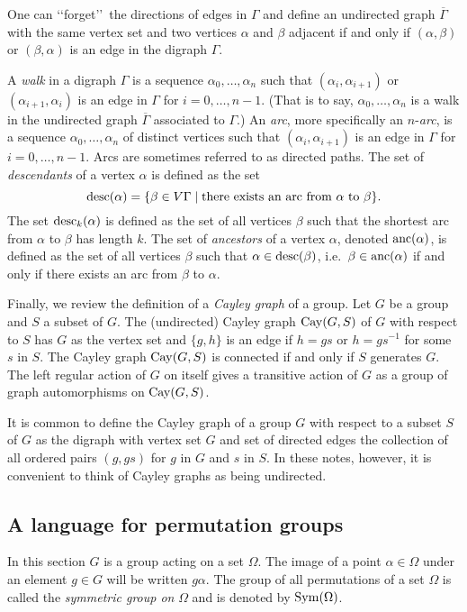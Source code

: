 \documentclass{emsprocart}
\theoremstyle{definition}
\begin{document}
One can \lq\lq forget\rq\rq\ the directions of edges in $\Gamma$ and define an undirected graph
$\overline{\Gamma}$ with the same vertex set and two vertices $\alpha$
and $\beta$ adjacent if and only if $(\alpha, \beta)$ or $(\beta,
\alpha)$ is an edge in the digraph $\Gamma$.

A {\em walk} in a digraph $\Gamma$ is a sequence $\alpha_0,
\ldots, \alpha_n$ such that $(\alpha_i, \alpha_{i+1})$ or
$(\alpha_{i+1}, \alpha_i)$ is an edge in $\Gamma$ for $i=0, \ldots,
n-1$.  (That is to say, $\alpha_0,
\ldots, \alpha_n$ is a walk in the undirected graph
$\overline{\Gamma}$ associated to $\Gamma$.)   An {\em arc}, more specifically an $n$-{\em arc},
is a sequence $\alpha_0,\ldots, \alpha_n$ of distinct vertices  such that
$(\alpha_i, \alpha_{i+1})$ is an edge in $\Gamma$ for $i=0, \ldots,
n-1$.  Arcs are sometimes referred to as directed paths.  The set of {\em descendants} of a vertex $\alpha$ is defined as
the set
$${\mbox{${\rm desc}$}}(\alpha)=\{\beta\in V\Gamma\mid \mbox{there exists an arc
   from }\alpha\mbox{ to }\beta\}.$$
The set ${\mbox{${\rm desc}$}}_k(\alpha)$ is defined as the set of all vertices $\beta$
  such that the shortest arc from $\alpha$ to $\beta$ has
  length $k$.
The set of {\em ancestors} of a vertex $\alpha$, denoted
  ${\mbox{${\rm anc}$}}(\alpha)$,  is defined as the set
  of all vertices $\beta$ such that $\alpha \in {\mbox{${\rm desc}$}}(\beta)$, i.e.\
  $\beta\in {\mbox{${\rm anc}$}}(\alpha)$ if and only if there exists an arc
  from $\beta$ to $\alpha$.

\medskip

Finally, we review the definition of a \emph{Cayley graph} of a group.  Let $G$
be a group and $S$ a subset of $G$.  The (undirected) Cayley graph
${\mbox{${\rm Cay}$}}(G, S)$ of $G$ with
respect to $S$ has $G$ as the vertex set and $\{g, h\}$ is an edge if
$h=gs$ or $h=gs^{-1}$ for some $s$ in $S$.  The Cayley graph
${\mbox{${\rm Cay}$}}(G, S)$ is connected if and only if $S$ generates $G$.  The left regular
action of $G$ on itself gives a transitive action of $G$ as a group of
graph automorphisms on ${\mbox{${\rm Cay}$}}(G, S)$.

It is common to define the Cayley graph of a group $G$ with respect to a subset
$S$ of $G$ as the digraph with vertex set $G$ and set of directed edges
the collection of all ordered pairs $(g,gs)$ for $g$ in $G$ and $s$ in $S$.
In these notes, however,  it is convenient to
think of Cayley graphs as being undirected.

\subsection{A language for permutation groups}\label{Sperm}
In this section $G$ is a group acting on a set $\Omega$.
The image of a point $\alpha\in \Omega$ under an
element $g\in G$ will be written $g\alpha$.
The group of all permutations of a set $\Omega$ is called the {\em
  symmetric group on} $\Omega$ and is denoted by ${\mbox{${\rm Sym}$}}(\Omega)$.
\end{document}
